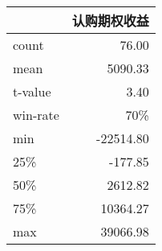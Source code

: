 \begin{tabular}{lr}
\toprule
{} &    认购期权收益 \\
\midrule
count &     76.00 \\
mean  &   5090.33 \\
t-value   & 3.40 \\
win-rate & 70\%\\
min   & -22514.80 \\
25\%   &   -177.85 \\
50\%   &   2612.82 \\ 
75\%   &  10364.27 \\
max   &  39066.98 \\
\bottomrule
\end{tabular}
